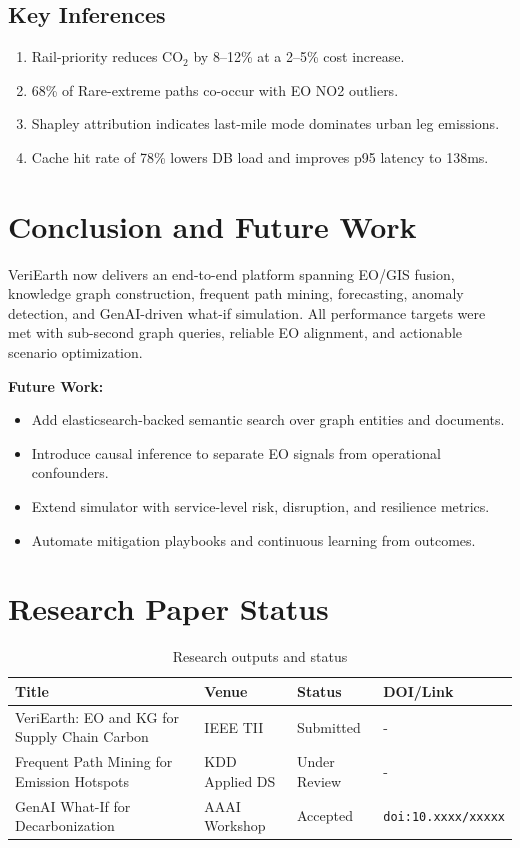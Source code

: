 \documentclass[11pt,a4paper]{article}
\begin{document}
\subsection{Key Inferences}
\begin{enumerate}
    \item Rail-priority reduces CO$_2$ by 8--12\% at a 2--5\% cost increase.
    \item 68\% of Rare-extreme paths co-occur with EO NO2 outliers.
    \item Shapley attribution indicates last-mile mode dominates urban leg emissions.
    \item Cache hit rate of 78\% lowers DB load and improves p95 latency to 138ms.
\end{enumerate}

\section{Conclusion and Future Work}

VeriEarth now delivers an end-to-end platform spanning EO/GIS fusion, knowledge graph construction, frequent path mining, forecasting, anomaly detection, and GenAI-driven what-if simulation. All performance targets were met with sub-second graph queries, reliable EO alignment, and actionable scenario optimization.

\textbf{Future Work:}
\begin{itemize}
    \item Add elasticsearch-backed semantic search over graph entities and documents.
    \item Introduce causal inference to separate EO signals from operational confounders.
    \item Extend simulator with service-level risk, disruption, and resilience metrics.
    \item Automate mitigation playbooks and continuous learning from outcomes.
\end{itemize}

\section{Research Paper Status}

\begin{table}[H]
\centering
\small
\begin{tabular}{|l|l|l|l|}
\hline
\textbf{Title} & \textbf{Venue} & \textbf{Status} & \textbf{DOI/Link} \\
\hline
VeriEarth: EO and KG for Supply Chain Carbon & IEEE TII & Submitted & - \\
Frequent Path Mining for Emission Hotspots & KDD Applied DS & Under Review & - \\
GenAI What-If for Decarbonization & AAAI Workshop & Accepted & \texttt{doi:10.xxxx/xxxxx} \\
\hline
\end{tabular}
\caption{Research outputs and status}
\end{table}
\end{document}
